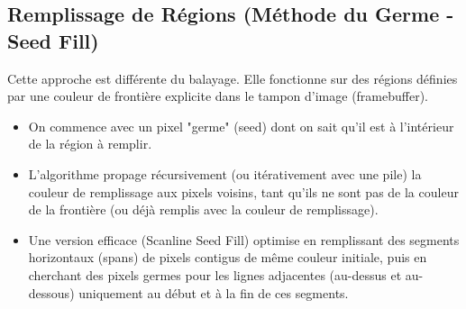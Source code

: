 \documentclass{article}
\begin{document}
\subsection{Remplissage de Régions (Méthode du Germe - Seed Fill)}

Cette approche est différente du balayage. Elle fonctionne sur des régions définies par une couleur de frontière explicite dans le tampon d'image (framebuffer).
\begin{itemize}
    \item On commence avec un pixel "germe" (seed) dont on sait qu'il est à l'intérieur de la région à remplir.
    \item L'algorithme propage récursivement (ou itérativement avec une pile) la couleur de remplissage aux pixels voisins, tant qu'ils ne sont pas de la couleur de la frontière (ou déjà remplis avec la couleur de remplissage).
    \item Une version efficace (Scanline Seed Fill) optimise en remplissant des segments horizontaux (spans) de pixels contigus de même couleur initiale, puis en cherchant des pixels germes pour les lignes adjacentes (au-dessus et au-dessous) uniquement au début et à la fin de ces segments.
\end{itemize}
\end{document}
